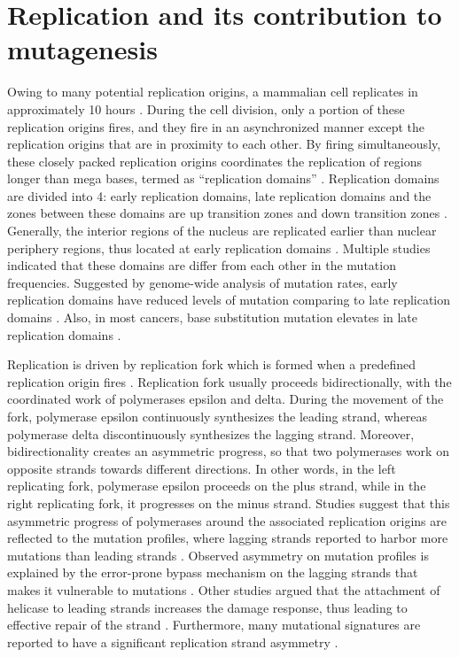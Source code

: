 \section{Replication and its contribution to mutagenesis}

Owing to many potential replication origins, a mammalian cell replicates in approximately 10 hours \citep{takebayashi2017anatomy}. During the cell division, only a portion of these replication origins fires, and they fire in an asynchronized manner except the replication origins that are in proximity to each other. By firing simultaneously, these closely packed replication origins coordinates the replication of regions longer than mega bases, termed as “replication domains” \citep{jackson1998replicon}. Replication domains are divided into 4: early replication domains, late replication domains and the zones between these domains are up transition zones and down transition zones \citep{farkash2008global,hansen2010sequencing,hiratani2008global,koren2014genetic,nakayasu1989mapping,o1992dynamic}. Generally, the interior regions of the nucleus are replicated earlier than nuclear periphery regions, thus located at early replication domains \citep{dimitrova2002spatio}. Multiple studies indicated that these domains are differ from each other in the mutation frequencies. Suggested by genome-wide analysis of mutation rates, early replication domains have reduced levels of mutation comparing to late replication domains \citep{lawrence2013mutational,stamatoyannopoulos2009human}. Also, in most cancers, base substitution mutation elevates in late replication domains \citep{schuster2012chromatin}.

Replication is driven by replication fork which is formed when a predefined replication origin fires \citep{langston2009whither}. Replication fork usually proceeds bidirectionally, with the coordinated work of polymerases \gls{epsilon} and \gls{delta}. During the movement of the fork, polymerase \gls{epsilon} continuously synthesizes the leading strand, whereas polymerase \gls{delta} discontinuously synthesizes the lagging strand. Moreover, bidirectionality creates an asymmetric progress, so that two polymerases work on opposite strands towards different directions. In other words, in the left replicating fork, polymerase \gls{epsilon} proceeds on the plus strand, while in the right replicating fork, it progresses on the minus strand. Studies suggest that this asymmetric progress of polymerases around the associated replication origins are reflected to the mutation profiles, where lagging strands reported to harbor more mutations than leading strands \citep{haradhvala2016mutational,lujan2012mismatch,reijns2015lagging,shinbrot2014exonuclease}. Observed asymmetry on mutation profiles is explained by the error-prone bypass mechanism on the lagging strands that makes it vulnerable to mutations \citep{seplyarskiy2019error}. Other studies argued that the attachment of helicase to leading strands increases the damage response, thus leading to effective repair of the strand \citep{hedglin2017eukaryotic,yeeles2013rescuing}. Furthermore, many mutational signatures are reported to have a significant replication strand asymmetry \citep{tomkova2018mutational}.


